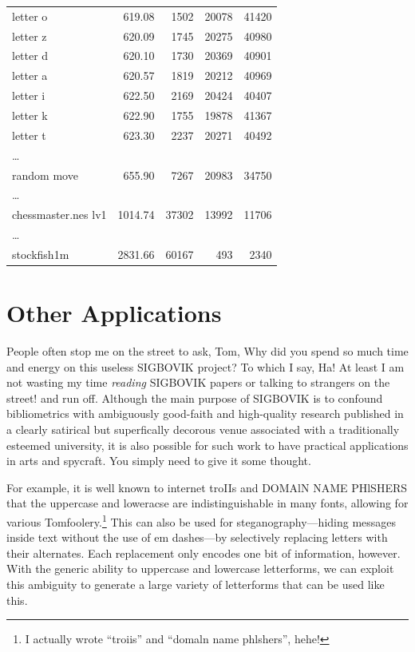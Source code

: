 \documentclass[twocolumn]{article}
\begin{document}
{\begin{center}
\begin{supertabular}{lrrrr}
letter o & 619.08 & 1502 & 20078 & 41420 \\
letter z & 620.09 & 1745 & 20275 & 40980 \\
letter d & 620.10 & 1730 & 20369 & 40901 \\
letter a & 620.57 & 1819 & 20212 & 40969 \\
letter i & 622.50 & 2169 & 20424 & 40407 \\
letter k & 622.90 & 1755 & 19878 & 41367 \\
letter t & 623.30 & 2237 & 20271 & 40492 \\
\ldots \\
random move & 655.90 & 7267 & 20983 & 34750 \\
\ldots \\
chessmaster.nes lv1 & 1014.74 & 37302 & 13992 & 11706 \\
\ldots \\
stockfish1m & 2831.66 & 60167 & 493 & 2340 \\
\end{supertabular}
\end{center}
}



\section{Other Applications}

People often stop me on the street to ask, Tom, Why did you spend so
much time and energy on this useless SIGBOVIK project? To which I say,
Ha! At least I am not wasting my time {\it reading} SIGBOVIK papers or
talking to strangers on the street! and run off. Although the main
purpose of SIGBOVIK is to confound bibliometrics with ambiguously
good-faith and high-quality research published in a clearly satirical
but superfically decorous venue associated with a traditionally
esteemed university, it is also possible for such work to have
practical applications in arts and spycraft. You simply need to give
it some thought.

For example, it is well known to {\sf internet troIIs} and {\sf DOMAlN
  NAME PHlSHERS} that the uppercase  and loweracse
 are indistinguishable in many fonts, allowing for
various Tomfoolery.\footnote{I actually wrote ``troiis'' and ``domaln
  name phlshers'', hehe!} This can also be used for
steganography---hiding messages inside text without the use of em
dashes---by selectively replacing letters with their alternates. Each
replacement only encodes one bit of information, however. With the
generic ability to uppercase and lowercase letterforms, we can exploit
this ambiguity to generate a large variety of letterforms that can be
used like this.
\end{document}
